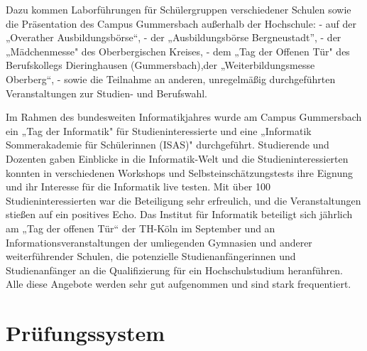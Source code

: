 Dazu kommen Laborführungen für Schülergruppen verschiedener Schulen
sowie die Präsentation des Campus Gummersbach außerhalb der Hochschule:
- auf der „Overather Ausbildungsbörse``, - der „Ausbildungsbörse
Bergneustadt'', - der „Mädchenmesse" des Oberbergischen Kreises, - dem
„Tag der Offenen Tür" des Berufskollegs Dieringhausen (Gummersbach),der
„Weiterbildungsmesse Oberberg``, - sowie die Teilnahme an anderen,
unregelmäßig durchgeführten Veranstaltungen zur Studien- und Berufswahl.

Im Rahmen des bundesweiten Informatikjahres wurde am Campus Gummersbach
ein „Tag der Informatik" für Studieninteressierte und eine „Informatik
Sommerakademie für Schülerinnen (ISAS)" durchgeführt. Studierende und
Dozenten gaben Einblicke in die Informatik-Welt und die
Studieninteressierten konnten in verschiedenen Workshops und
Selbsteinschätzungstests ihre Eignung und ihr Interesse für die
Informatik live testen. Mit über 100 Studieninteressierten war die
Beteiligung sehr erfreulich, und die Veranstaltungen stießen auf ein
positives Echo. Das Institut für Informatik beteiligt sich jährlich am
„Tag der offenen Tür`` der TH-Köln im September und an
Informationsveranstaltungen der umliegenden Gymnasien und anderer
weiterführender Schulen, die potenzielle Studienanfängerinnen und
Studienanfänger an die Qualifizierung für ein Hochschulstudium
heranführen. Alle diese Angebote werden sehr gut aufgenommen und sind
stark frequentiert.

\chapter{Prüfungssystem}\label{pruxfcfungssystem}


